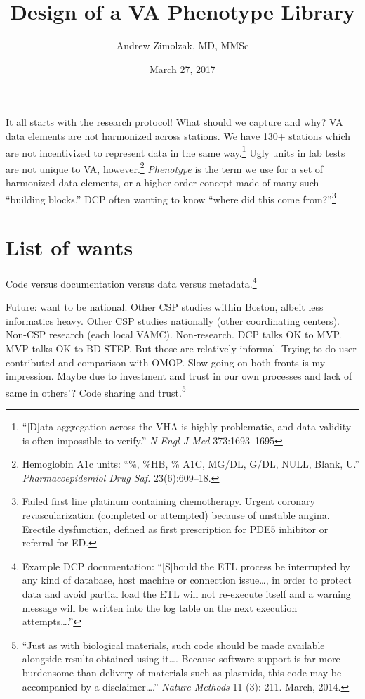 \documentclass{tufte-handout}
\title{Design of a VA Phenotype Library}
\author{Andrew Zimolzak, MD, MMSc}
\date{March 27, 2017}
\begin{document}
\maketitle

It all starts with the research protocol! What should we capture and
why? VA data elements are not harmonized across stations. We have 130+
stations which are not incentivized to represent data in the same
way.\footnote{``[D]ata aggregation across the VHA is highly
  problematic, and data validity is often impossible to verify.''
  \emph{N Engl J Med} 373:1693--1695} Ugly units in lab tests are not
unique to VA, however.\footnote{Hemoglobin A1c units: ``\%, \%HB, \%
  A1C, MG/DL, G/DL, NULL, Blank, U.'' \emph{Pharmacoepidemiol Drug
    Saf.} 23(6):609--18.} \emph{Phenotype} is the term we use for a
set of harmonized data elements, or a higher-order concept made of
many such ``building blocks.'' DCP often wanting to know ``where did
this come from?''\footnote{Failed first line platinum containing
  chemotherapy. Urgent coronary revascularization (completed or
  attempted) because of unstable angina. Erectile dysfunction, defined
  as first prescription for PDE5 inhibitor or referral for ED.}

\section{List of wants}

Code versus documentation versus data versus
metadata.\footnote{Example DCP documentation: ``[S]hould the ETL
  process be interrupted by any kind of database, host machine or
  connection issue\ldots{}, in order to protect data and avoid partial
  load the ETL will not re-execute itself and a warning message will
  be written into the log table on the next execution
  attempts\ldots{}.''}

Future: want to be national. Other CSP studies within Boston, albeit
less informatics heavy. Other CSP studies nationally (other
coordinating centers). Non-CSP research (each local VAMC).
Non-research. DCP talks OK to MVP. MVP talks OK to BD-STEP. But those
are relatively informal. Trying to do user contributed and comparison
with OMOP. Slow going on both fronts is my impression. Maybe due to
investment and trust in our own processes and lack of same in others'?
Code sharing and trust.\footnote{``Just as with biological materials,
  such code should be made available alongside results obtained using
  it\ldots{}. Because software support is far more burdensome than
  delivery of materials such as plasmids, this code may be accompanied
  by a disclaimer\ldots{}.'' \emph{Nature Methods} 11 (3): 211. March,
  2014.}
\end{document}
